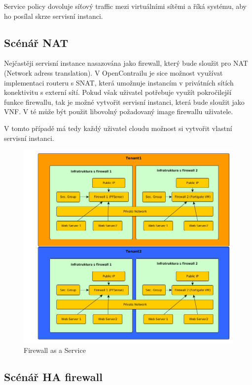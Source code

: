 Service policy dovoluje síťový traffic mezi virtuálními sítěmi a říká systému, aby ho posílal skrze servisní instanci.

\subsection{Scénář NAT}

Nejčastěji servisní instance nasazována jako firewall, který bude sloužit pro NAT (Network adress translation). V OpenContrailu je sice možnost využívat implementaci routeru s SNAT, která umožnuje instancím v privátních sítích konektivitu s externí sítí. Pokud však uživatel potřebuje využít pokročilejší funkce firewallu, tak je možné vytvořit servisní instanci, která bude sloužit jako VNF. V té může být použit libovolný požadovaný image firewallu uživatele.

V tomto případě má tedy každý uživatel cloudu možnost si vytvořit vlastní servisní instanci.  


\begin{figure}[h]
\begin{centering}
\includegraphics[scale=0.43]{images/firewall}
\par\end{centering}
\caption{Firewall as a Service\label{fig:firewall}}
\end{figure}


\subsection{Scénář HA firewall}

